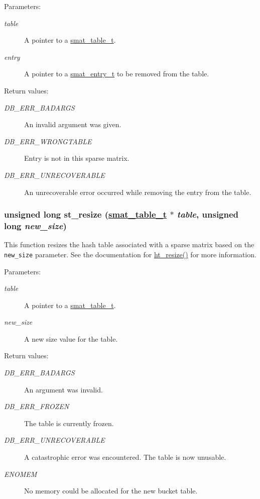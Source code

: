 \begin{Desc}
\item[Parameters:]
\begin{description}
\item[{\em table}]A pointer to a \hyperlink{group__dbprim__smat_a0}{smat\_\-table\_\-t}. \item[{\em entry}]A pointer to a \hyperlink{group__dbprim__smat_a2}{smat\_\-entry\_\-t} to be removed from the table.\end{description}
\end{Desc}
\begin{Desc}
\item[Return values:]
\begin{description}
\item[{\em DB\_\-ERR\_\-BADARGS}]An invalid argument was given. \item[{\em DB\_\-ERR\_\-WRONGTABLE}]Entry is not in this sparse matrix. \item[{\em DB\_\-ERR\_\-UNRECOVERABLE}]An unrecoverable error occurred while removing the entry from the table. \end{description}
\end{Desc}
\hypertarget{group__dbprim__smat_a15}{
\subsubsection[st\_\-resize]{\setlength{\rightskip}{0pt plus 5cm}unsigned long st\_\-resize (\hyperlink{dbprim_8h_a0}{smat\_\-table\_\-t} $\ast$ {\em table}, unsigned long {\em new\_\-size})}}
\label{group__dbprim__smat_a15}


This function resizes the hash table associated with a sparse matrix based on the {\tt new\_\-size} parameter. See the documentation for \hyperlink{group__dbprim__hash_a13}{ht\_\-resize()} for more information.

\begin{Desc}
\item[Parameters:]
\begin{description}
\item[{\em table}]A pointer to a \hyperlink{group__dbprim__smat_a0}{smat\_\-table\_\-t}. \item[{\em new\_\-size}]A new size value for the table.\end{description}
\end{Desc}
\begin{Desc}
\item[Return values:]
\begin{description}
\item[{\em DB\_\-ERR\_\-BADARGS}]An argument was invalid. \item[{\em DB\_\-ERR\_\-FROZEN}]The table is currently frozen. \item[{\em DB\_\-ERR\_\-UNRECOVERABLE}]A catastrophic error was encountered. The table is now unusable. \item[{\em ENOMEM}]No memory could be allocated for the new bucket table. \end{description}
\end{Desc}
